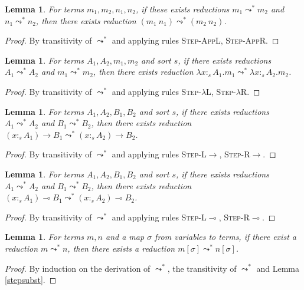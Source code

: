 \documentclass{article}
\newtheorem{lemma}[theorem]{Lemma}
\theoremstyle{definition}
\newcommand{\rname}[1]{\textsc{\footnotesize #1}}
\newcommand{\stype}[1]{:_{#1}}
\newcommand{\red}{\leadsto^*}
\begin{document}
\begin{lemma}\label{redapp}
  For terms $m_1, m_2, n_1, n_2$, if these exists reductions $m_1 \red m_2$ and $n_1 \red n_2$, then there exists reduction $(m_1\ n_1) \red (m_2\ n_2)$.
\end{lemma}
\begin{proof}
  By transitivity of $\red$ and applying rules \rname{Step-AppL}, \rname{Step-AppR}.
\end{proof}

\begin{lemma}\label{redlam}
  For terms $A_1, A_2, m_1, m_2$ and sort $s$, if there exists reductions $A_1 \red A_2$ and $m_1 \red m_2$, then there exists reduction $\lambda x \stype{s}A_1.m_1 \red \lambda x \stype{s}A_2.m_2$.
\end{lemma}
\begin{proof}
  By transitivity of $\red$ and applying rules \rname{Step-$\lambda$L}, \rname{Step-$\lambda$R}.
\end{proof}

\begin{lemma}\label{redarrow}
  For terms $A_1, A_2, B_1, B_2$ and sort $s$, if there exists reductions $A_1 \red A_2$ and $B_1 \red B_2$, then there exists reduction $(x \stype{s}A_1) \rightarrow B_1 \red (x \stype{s} A_2) \rightarrow B_2$.
\end{lemma}
\begin{proof}
  By transitivity of $\red$ and applying rules \rname{Step-L$\rightarrow$}, \rname{Step-R$\rightarrow$}.
\end{proof}

\begin{lemma}\label{redlolli}
  For terms $A_1, A_2, B_1, B_2$ and sort $s$, if there exists reductions $A_1 \red A_2$ and $B_1 \red B_2$, then there exists reduction $(x \stype{s}A_1) \multimap B_1 \red (x \stype{s} A_2) \multimap B_2$.
\end{lemma}
\begin{proof}
  By transitivity of $\red$ and applying rules \rname{Step-L$\multimap$}, \rname{Step-R$\multimap$}.
\end{proof}

\begin{lemma}\label{redsubst}
  For terms $m, n$ and a map $\sigma$ from variables to terms, if there exist a reduction $m \red n$, then there exists a reduction $m[\sigma] \red n[\sigma]$.
\end{lemma}
\begin{proof}
  By induction on the derivation of $\red$, the transitivity of $\red$ and Lemma \ref{stepsubst}.
\end{proof}
\end{document}
